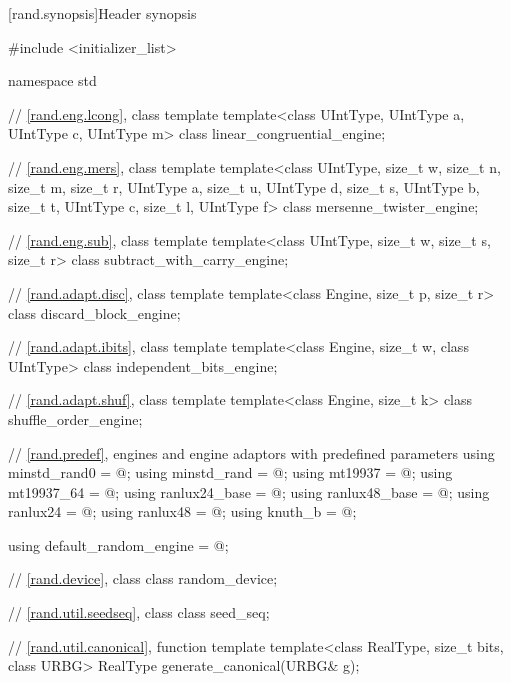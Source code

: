 [rand.synopsis]{Header  synopsis}%
%
%

\begin{codeblock}
#include <initializer_list>

namespace std {
  // \ref{rand.eng.lcong}, class template 
  template<class UIntType, UIntType a, UIntType c, UIntType m>
    class linear_congruential_engine;

  // \ref{rand.eng.mers}, class template 
  template<class UIntType, size_t w, size_t n, size_t m, size_t r,
           UIntType a, size_t u, UIntType d, size_t s,
           UIntType b, size_t t,
           UIntType c, size_t l, UIntType f>
    class mersenne_twister_engine;

  // \ref{rand.eng.sub}, class template 
  template<class UIntType, size_t w, size_t s, size_t r>
    class subtract_with_carry_engine;

  // \ref{rand.adapt.disc}, class template 
  template<class Engine, size_t p, size_t r>
    class discard_block_engine;

  // \ref{rand.adapt.ibits}, class template 
  template<class Engine, size_t w, class UIntType>
    class independent_bits_engine;

  // \ref{rand.adapt.shuf}, class template 
  template<class Engine, size_t k>
    class shuffle_order_engine;

  // \ref{rand.predef}, engines and engine adaptors with predefined parameters
  using minstd_rand0  = @\seebelow@;
  using minstd_rand   = @\seebelow@;
  using mt19937       = @\seebelow@;
  using mt19937_64    = @\seebelow@;
  using ranlux24_base = @\seebelow@;
  using ranlux48_base = @\seebelow@;
  using ranlux24      = @\seebelow@;
  using ranlux48      = @\seebelow@;
  using knuth_b       = @\seebelow@;

  using default_random_engine = @\seebelow@;

  // \ref{rand.device}, class 
  class random_device;

  // \ref{rand.util.seedseq}, class 
  class seed_seq;

  // \ref{rand.util.canonical}, function template 
  template<class RealType, size_t bits, class URBG>
    RealType generate_canonical(URBG& g);

}
\end{codeblock}
